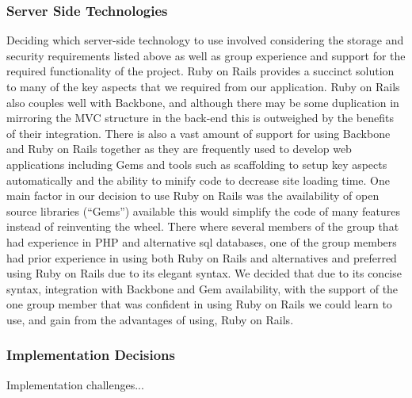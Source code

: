 	\subsubsection{Server Side Technologies}
		Deciding which server-side technology to use involved considering the storage and security requirements listed above as well as group experience and support for the required functionality of the project. Ruby on Rails provides a succinct solution to many of the key aspects that we required from our application. Ruby on Rails also couples well with Backbone, and although there may be some duplication in mirroring the MVC structure in the back-end this is outweighed by the benefits of their integration. There is also a vast amount of support for using Backbone and Ruby on Rails together as they are frequently used to develop web applications including Gems and tools such as scaffolding to setup key aspects automatically and the ability to minify code to decrease site loading time.
		One main factor in our decision to use Ruby on Rails was the availability of open source libraries (``Gems'') available this would simplify the code of many features instead of reinventing the wheel.
		There where several members of the group that had experience in PHP and alternative sql databases, one of the group members had prior experience in using both Ruby on Rails and alternatives and preferred using Ruby on Rails due to its elegant syntax. We decided that due to its concise syntax, integration with Backbone and Gem availability, with the support of the one group member that was confident in using Ruby on Rails we could learn to use, and gain from the advantages of using, Ruby on Rails.
	
	\subsubsection{Implementation Decisions}
		Implementation challenges...